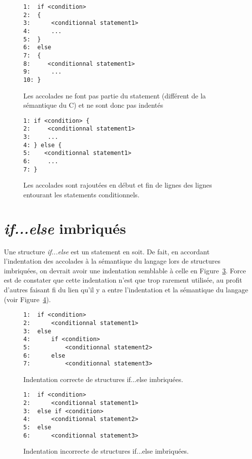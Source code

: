 \documentclass{article}
\begin{document}
\begin{figure}
\begin{framed}
\begin{verbatim}
1:  if <condition> 
2:  {
3:      <conditionnal statement1>
4:      ...
5:  }
6:  else 
7:  {
8:     <conditionnal statement1>
9:      ...
10: }
\end{verbatim}
\end{framed}
\caption{Les accolades ne font pas partie du statement (différent de la sémantique du C) et ne sont donc pas indentés}
\label{fig:if2}
\end{figure}

\begin{figure}
\begin{framed}
\begin{verbatim}
1: if <condition> {
2:     <conditionnal statement1>
3:     ...
4: } else {
5:    <conditionnal statement1>
6:     ...
7: }
\end{verbatim}
\end{framed}
\caption{Les accolades sont rajoutées en début et fin de lignes des lignes entourant les statements conditionnels.}
\label{fig:if3}
\end{figure}

\section{\emph{if...else} imbriqués}
Une structure \emph{if...else} est un statement en soit. De fait, en accordant l'indentation des accolades à la sémantique du langage lors de structures imbriquées, on devrait avoir une indentation semblable à celle en Figure~\ref{fig:if4}. Force est de constater que cette indentation n'est que trop rarement utilisée, au profit d'autres faisant fi du lien qu'il y a entre l'indentation et la sémantique du langage (voir Figure~\ref{fig:if5}).

\begin{figure}
\begin{framed}
\begin{verbatim}
1:  if <condition> 
2:      <conditionnal statement1>
3:  else 
4:      if <condition> 
5:          <conditionnal statement2>
6:      else 
7:          <conditionnal statement3>
\end{verbatim}
\end{framed}
\caption{Indentation correcte de structures if...else imbriquées.}
\label{fig:if4}
\end{figure}

\begin{figure}
\begin{framed}
\begin{verbatim}
1:  if <condition> 
2:      <conditionnal statement1>
3:  else if <condition> 
4:      <conditionnal statement2>
5:  else 
6:      <conditionnal statement3>
\end{verbatim}
\end{framed}
\caption{Indentation incorrecte de structures if...else imbriquées.}
\label{fig:if5}
\end{figure}
\end{document}
